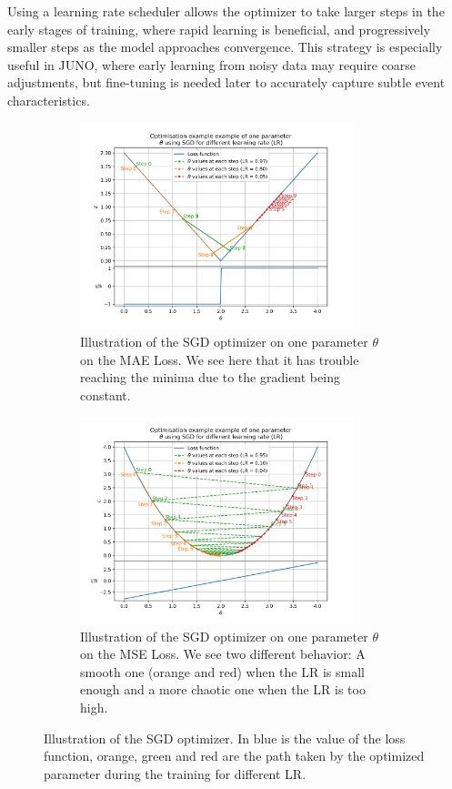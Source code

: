 \documentclass[../main.tex]{subfiles}
\begin{document}
Using a learning rate scheduler allows the optimizer to take larger steps in the early stages of training, where rapid learning is beneficial, and progressively smaller steps as the model approaches convergence. This strategy is especially useful in JUNO, where early learning from noisy data may require coarse adjustments, but fine-tuning is needed later to accurately capture subtle event characteristics.

\begin{figure}
  \centering
  \begin{subfigure}[t]{0.48\linewidth}
    \includegraphics[height=6cm]{scripts/plots/MAE_illustration.png}
    \caption{Illustration of the SGD optimizer on one parameter $\theta$ on the MAE Loss. We see here that it has trouble reaching the minima due to the gradient being constant.}
    \label{fig:ml:optims:mae}
  \end{subfigure}
  \hfill
  \begin{subfigure}[t]{0.48\linewidth}
    \includegraphics[height=6cm]{scripts/plots/MSE_illustration.png}
    \caption{Illustration of the SGD optimizer on one parameter $\theta$ on the MSE Loss. We see two different behavior: A smooth one (orange and red) when the LR is small enough and a more chaotic one when the LR is too high.}
    \label{fig:ml:optims:mse}
  \end{subfigure}
  \caption{Illustration of the SGD optimizer. In blue is the value of the loss function, orange, green and red are the path taken by the optimized parameter during the training for different LR.}
  \label{fig:ml:optims}
\end{figure}
\end{document}
